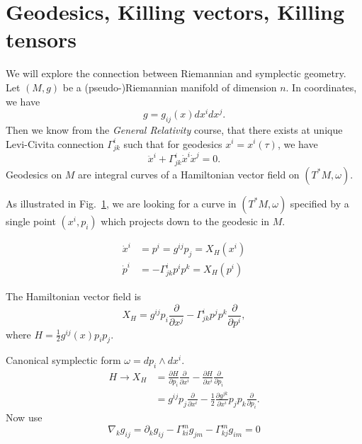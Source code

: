 
\section{Geodesics, Killing vectors, Killing tensors}%
\label{sec:geodesics_killing_vectors_killing_tensors}

We will explore the connection between Riemannian and symplectic geometry.
Let $(M, g)$ be a (pseudo-)Riemannian manifold of dimension $n$.
In coordinates, we have
\begin{equation}
  g = g_{ij} (x) dx^{i} dx^{j}.
\end{equation}
Then we know from the \emph{General Relativity} course, that there exists at unique Levi-Civita connection $\Gamma^{i}_{jk}$ such that for geodesics $x^{i} = x^{i}(\tau)$, we have
\begin{equation}
  \ddot{x}^{i} + \Gamma^{i}_{jk} \dot{x}^{i} \dot{x}^{j} = 0.
\end{equation}
Geodesics on $M$ are integral curves of a Hamiltonian vector field on $(T^*M, \omega)$.

As illustrated in Fig.~\ref{fig:l8f1}, we are looking for a curve in $(T^*M, \omega)$ specified by a single point $(x^{i}, p_i)$ which projects down to the geodesic in $M$.
\begin{figure}[tbhp]
  \centering
  \def\svgwidth{0.6\columnwidth}
  
  \caption{}
  \label{fig:l8f1}
\end{figure}

\begin{align}
  \dot{x}^{i} &= p^{i} = g^{ij} p_j = X_H (x^{i}) \\
  \dot{p}^{i} &= -\Gamma^{i}_{jk} p^{i} p^{k} = X_H (p^{i})
\end{align}

The Hamiltonian vector field is 
\begin{equation}
  X_H = g^{ij} p_i \frac{\partial }{\partial x^{j}} - \Gamma^{i}_{jk} p^{j} p^{k} \frac{\partial }{\partial p^{i}},
\end{equation}
where $H = \frac{1}{2} g^{ij}(x) p_{i} p_{j}$.

Canonical symplectic form $\omega = dp_i \wedge dx^{i}$.
\begin{align}
  H \rightarrow X_H &= \frac{\partial H}{\partial p_i} \frac{\partial }{\partial x^{i}} - \frac{\partial H}{\partial x^{i}} \frac{\partial }{\partial p_i} \\
  &= g^{ij} p_j \frac{\partial }{\partial x^{i}} - \frac{1}{2} \frac{\partial g^{jk}}{\partial x^{i}} p_j p_k \frac{\partial }{\partial p_i}.
\end{align}
Now use
\begin{equation}
  \label{eq:8-star}
  \nabla_k g_{ij} = \partial_k g_{ij} - \Gamma^{m}_{ki} g_{jm} - \Gamma^{m}_{kj} g_{im} = 0
\end{equation}


